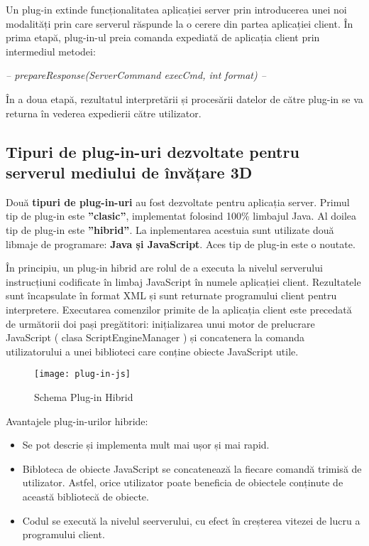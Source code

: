Un plug-in extinde funcționalitatea aplicației server prin introducerea unei noi modalități prin care serverul răspunde la o cerere din partea aplicației client. În prima etapă, plug-in-ul preia comanda expediată de aplicația client prin intermediul metodei: \begin{center} \textit{-- prepareResponse(ServerCommand execCmd, int format) --}
\end{center} În a doua etapă, rezultatul interpretării și procesării datelor de către plug-in se va returna în vederea expedierii către utilizator.

\subsection{Tipuri de plug-in-uri dezvoltate pentru serverul mediului de învățare 3D}
\par Două \textbf{tipuri de plug-in-uri} au fost dezvoltate pentru aplicația server. Primul tip de plug-in este \textbf{”clasic”}, implementat folosind 100\% limbajul Java. Al doilea tip de plug-in este \textbf{”hibrid”}. La inplementarea acestuia sunt utilizate două libmaje de programare: \textbf{Java și JavaScript}. Aces tip de plug-in este o noutate.

\par În principiu, un plug-in hibrid are rolul de a executa la nivelul serverului instrucțiuni codificate în limbaj JavaScript în numele aplicației client. Rezultatele sunt încapsulate în format XML și sunt returnate programului client pentru interpretere. Executarea comenzilor primite de la aplicația client este precedată de următorii doi pași pregătitori: inițializarea unui motor de prelucrare JavaScript ( clasa ScriptEngineManager ) și concatenera la comanda utilizatorului a unei biblioteci care conține obiecte JavaScript utile.\\

\begin{figure}[h]
    \centering
    \texttt{[image: plug-in-js]}
    \caption{Schema Plug-in Hibrid}
    \label{fig:imag6}
\end{figure}

\pagebreak

\par Avantajele plug-in-urilor hibride:
\begin{itemize}
\item Se pot descrie și implementa mult mai ușor și mai rapid.
\item Bibloteca de obiecte JavaScript se concatenează la fiecare comandă trimisă de utilizator. Astfel, orice utilizator poate beneficia de obiectele conținute de această bibliotecă de obiecte.
\item Codul se execută la nivelul seerverului, cu efect în creșterea vitezei de lucru a programului client.
\end{itemize}

